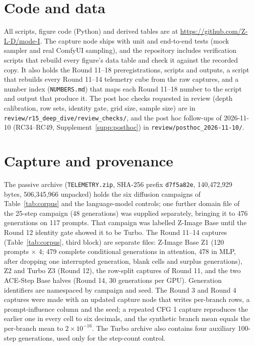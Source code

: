 \documentclass[11pt]{article}
\begin{document}
\section*{Code and data}
All scripts, figure code (Python) and derived tables are at \url{https://github.com/Z-L-D/mode-I}. The capture node ships with unit and end-to-end tests (mock sampler and real ComfyUI sampling), and the repository includes verification scripts that rebuild every figure's data table and check it against the recorded copy. It also holds the Round 11--18 preregistrations, scripts and outputs, a script that rebuilds every Round 11--14 telemetry cube from the raw captures, and a number index (\texttt{NUMBERS.md}) that maps each Round 11--18 number to the script and output that produce it. The post hoc checks requested in review (depth calibration, row sets, identity gate, grid size, sample size) are in \texttt{review/r15\_deep\_dive/review\_checks/}, and the post hoc follow-ups of 2026-11-10 (RC34--RC49, Supplement~\ref{supp:posthoc}) in \texttt{review/posthoc\_2026-11-10/}.




\appendix
\section{Capture and provenance}\label{app:provenance}
The passive archive (\texttt{TELEMETRY.zip}, SHA-256 prefix \texttt{d7f5a82e}, 140{,}472{,}929 bytes, 506{,}345{,}966 unpacked) holds the six diffusion campaigns of Table~\ref{tab:corpus} and the language-model controls; one further domain file of the 25-step campaign (48 generations) was supplied separately, bringing it to 476 generations on 117 prompts. That campaign was labelled Z-Image Base until the Round 12 identity gate showed it to be Turbo. The Round 11--14 captures (Table~\ref{tab:corpus}, third block) are separate files: Z-Image Base Z1 (120 prompts $\times$ 4; 479 complete conditional generations in attention, 478 in MLP, after dropping one interrupted generation, blank cells and surplus generations), Z2 and Turbo Z3 (Round 12), the row-split captures of Round 11, and the two ACE-Step Base halves (Round 14, 30 generations per GPU). Generation identifiers are namespaced by campaign and seed. The Round 3 and Round 4 captures were made with an updated capture node that writes per-branch rows, a prompt-influence column and the seed; a repeated CFG 1 capture reproduces the earlier one in every cell to six decimals, and the synthetic branch mean equals the per-branch mean to $2\times10^{-16}$. The Turbo archive also contains four auxiliary 100-step generations, used only for the step-count control.
\end{document}
